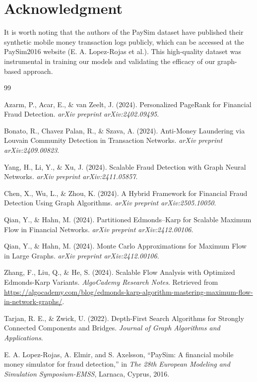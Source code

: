 \documentclass[lettersize,journal]{IEEEtran}
\begin{document}
\section*{Acknowledgment}

It is worth noting that the authors of the PaySim dataset have published their synthetic mobile money transaction logs publicly, which can be accessed at the PaySim2016 website (E. A. Lopez-Rojas et al.). This high-quality dataset was instrumental in training our models and validating the efficacy of our graph-based approach.

\begin{thebibliography}{99}

 Azarm, P., Acar, E., \& van Zeelt, J. (2024). Personalized PageRank for Financial Fraud Detection. \textit{arXiv preprint arXiv:2402.09495}.

 Bonato, R., Chavez Palan, R., \& Szava, A. (2024). Anti-Money Laundering via Louvain Community Detection in Transaction Networks. \textit{arXiv preprint arXiv:2409.00823}.

 Yang, H., Li, Y., \& Xu, J. (2024). Scalable Fraud Detection with Graph Neural Networks. \textit{arXiv preprint arXiv:2411.05857}.

 Chen, X., Wu, L., \& Zhou, K. (2024). A Hybrid Framework for Financial Fraud Detection Using Graph Algorithms. \textit{arXiv preprint arXiv:2505.10050}.

 Qian, Y., \& Hahn, M. (2024). Partitioned Edmonds–Karp for Scalable Maximum Flow in Financial Networks. \textit{arXiv preprint arXiv:2412.00106}.

 Qian, Y., \& Hahn, M. (2024). Monte Carlo Approximations for Maximum Flow in Large Graphs. \textit{arXiv preprint arXiv:2412.00106}.

 Zhang, F., Liu, Q., \& He, S. (2024). Scalable Flow Analysis with Optimized Edmonds-Karp Variants. \textit{AlgoCademy Research Notes}. Retrieved from \url{https://algocademy.com/blog/edmonds-karp-algorithm-mastering-maximum-flow-in-network-graphs/}.

 Tarjan, R. E., \& Zwick, U. (2022). Depth-First Search Algorithms for Strongly Connected Components and Bridges. \textit{Journal of Graph Algorithms and Applications}.

 E. A. Lopez-Rojas, A. Elmir, and S. Axelsson, ``PaySim: A financial mobile money simulator for fraud detection,'' in \textit{The 28th European Modeling and Simulation Symposium-EMSS}, Larnaca, Cyprus, 2016.


\end{thebibliography}
\end{document}
